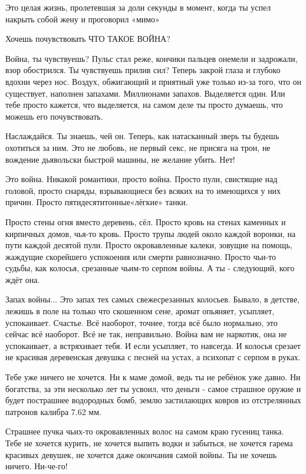Это целая жизнь, пролетевшая за доли секунды в момент, когда ты успел накрыть
собой жену и проговорил «мимо»

Хочешь почувствовать ЧТО ТАКОЕ ВОЙНА?

Война, ты чувствуешь? Пульс стал реже, кончики пальцев онемели и задрожали,
взор обострился. Ты чувствуешь прилив сил? Теперь закрой глаза и глубоко вдохни
через нос. Воздух, обжигающий и приятный уже только из-за того, что он
существует, наполнен запахами. Миллионами запахов. Выделяется один. Или тебе
просто кажется, что выделяется, на самом деле ты просто думаешь, что можешь его
почувствовать.

Наслаждайся. Ты знаешь, чей он. Теперь, как натасканный зверь ты будешь
охотиться за ним. Это не любовь, не первый секс, не присяга на трон, не
вождение дьявольски быстрой машины, не желание убить. Нет!

Это война. Никакой романтики, просто война. Просто пули, свистящие над головой,
просто снаряды, взрывающиеся без всяких на то имеющихся у них причин. Просто
пятидесятитонные«лёгкие» танки.

Просто стены огня вместо деревень, сёл. Просто кровь на стенах каменных и
кирпичных домов, чья-то кровь. Просто трупы людей около каждой воронки, на пути
каждой десятой пули. Просто окровавленные калеки, зовущие на помощь, жаждущие
скорейшего успокоения или смерти равнозначно. Просто чьи-то судьбы, как
колосья, срезанные чьим-то серпом войны. А ты - следующий, кого ждёт она.

Запах войны... Это запах тех самых свежесрезанных колосьев. Бывало, в детстве,
лежишь в поле на только что скошенном сене, аромат опьяняет, усыпляет,
успокаивает. Счастье. Всё наоборот, точнее, тогда всё было нормально, это
сейчас всё наоборот. Всё не так, неправильно. Война вам не наркотик, она не
успокаивает, а встряхивает тебя. И если усыпляет, то навсегда. И колосья
срезает не красивая деревенская девушка с песней на устах, а психопат с серпом
в руках.

Тебе уже ничего не хочется. Ни к маме домой, ведь ты не ребёнок уже давно. Ни
богатства, за эти несколько лет ты усвоил, что деньги - самое страшное оружие и
будет пострашнее водородных бомб, землю застилающих ковров из отстрелянных
патронов калибра 7.62 мм.

Страшнее пучка чьих-то окровавленных волос на самом краю гусениц танка. Тебе не
хочется курить, не хочется выпить водки и забыться, не хочется гарема красивых
девушек, не хочется даже окончания самой войны. Ты не хочешь ничего. Ни-че-го!

